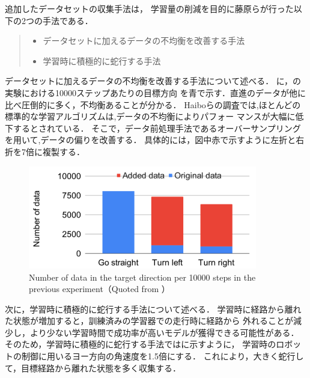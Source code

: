 追加したデータセットの収集手法は，
学習量の削減を目的に藤原ら\cite{fujiwara2023}が行った以下の2つの手法である．
\begin{quote}
    \begin{itemize}
     \item データセットに加えるデータの不均衡を改善する手法
     \item 学習時に積極的に蛇行する手法
    \end{itemize}
   \end{quote}

データセットに加えるデータの不均衡を改善する手法について述べる．
に，の実験における10000ステップあたりの目標方向
を青で示す．直進のデータが他に比べ圧倒的に多く，不均衡あることが分かる．
Haiboらの調査\cite{hukinko}では,ほとんどの標準的な学習アルゴリズムは,データの不均衡によりパフォー
マンスが大幅に低下するとされている．
そこで，データ前処理手法であるオーバーサンプリングを用いて,データの偏りを改善する．
具体的には，図中赤で示すように左折と右折を7倍に複製する．
\vspace{3zh}
\begin{figure}[htbp]
    \centering
     \includegraphics[width=100mm]{images/pdf/oversmple.pdf}
     \caption[Number of data in the target direction per 10000 steps
     in the previous experiment]{Number of data in the target direction per 10000 steps
     in the previous experiment（Quoted from \cite{fujiwara2023}）}\label{fig:oversmple}
\end{figure}
\clearpage
次に，学習時に積極的に蛇行する手法について述べる．
学習時に経路から離れた状態が増加すると，訓練済みの学習器での走行時に経路から
外れることが減少し，より少ない学習時間で成功率が高いモデルが獲得できる可能性がある．
そのため，学習時に積極的に蛇行する手法ではに示すように，
学習時のロボットの制御に用いるヨー方向の角速度を1.5倍にする．
これにより，大きく蛇行して，目標経路から離れた状態を多く収集する．

